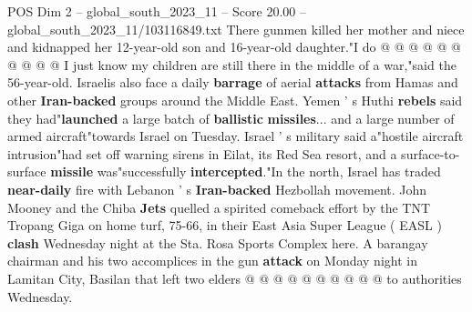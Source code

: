 \begin{textsample}{POS Dim 2 – global\_south\_2023\_11 – Score 20.00 – global\_south\_2023\_11/103116849.txt}
There gunmen killed her mother and niece and kidnapped her 12-year-old son and 16-year-old daughter."I do @ @ @ @ @ @ @ @ @ @ I just know my children are still there in the middle of a war,"said the 56-year-old.
Israelis also face a daily \textbf{barrage} of aerial \textbf{attacks} from Hamas and other \textbf{Iran-backed} groups around the Middle East.
Yemen ' s Huthi \textbf{rebels} said they had"\textbf{launched} a large batch of \textbf{ballistic} \textbf{missiles}... and a large number of armed aircraft"towards Israel on Tuesday.
Israel ' s military said a"hostile aircraft intrusion"had set off warning sirens in Eilat, its Red Sea resort, and a surface-to-surface \textbf{missile} was"successfully \textbf{intercepted}."In the north, Israel has traded \textbf{near-daily} fire with Lebanon ' s \textbf{Iran-backed} Hezbollah movement.
John Mooney and the Chiba \textbf{Jets} quelled a spirited comeback effort by the TNT Tropang Giga on home turf, 75-66, in their East Asia Super League ( EASL ) \textbf{clash} Wednesday night at the Sta.
Rosa Sports Complex here.
A barangay chairman and his two accomplices in the gun \textbf{attack} on Monday night in Lamitan City, Basilan that left two elders @ @ @ @ @ @ @ @ @ @ to authorities Wednesday.

\end{textsample}

